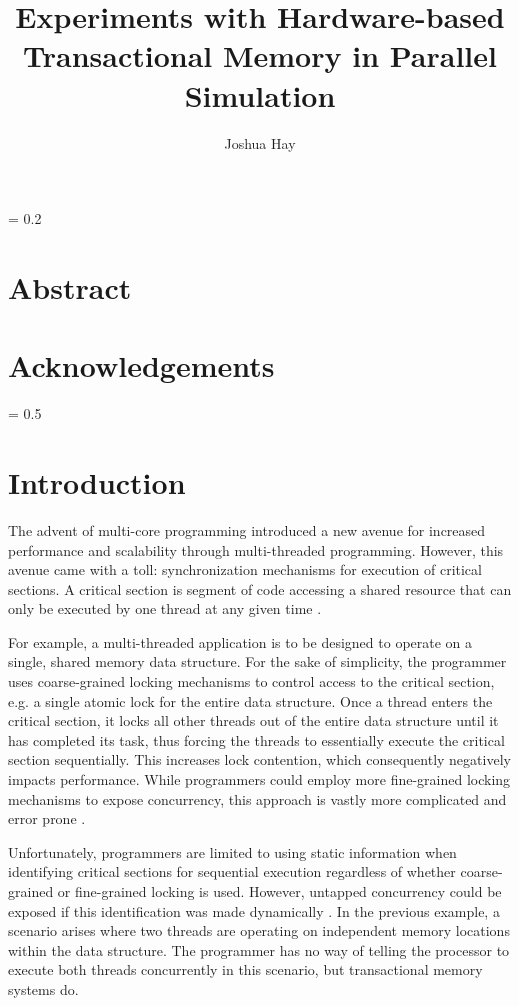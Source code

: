 \documentclass[a4paper]{article}
\title{
    \vspace{2in}
    \textbf{Experiments with Hardware-based Transactional Memory in Parallel
    Simulation \\}
    \vspace{2in}
}
\author{Joshua Hay}
\affil{hayja@mail.uc.edu}
\affil{(513) 607-4929}
\begin{document}
%
\maketitle
\thispagestyle{empty}
\newpage
\thispagestyle{empty}
\parskip = 0.2\baselineskip
\newpage
\thispagestyle{empty}
\section*{\textbf{Abstract}}
\newpage
\thispagestyle{empty}
\section*{\textbf{Acknowledgements}}
\newpage
\thispagestyle{empty}
\tableofcontents
\newpage
\thispagestyle{empty}
\listoffigures
\listoftables
\parskip = 0.5\baselineskip
\newpage

\section{\textbf{Introduction}}

\indent 
The advent of multi-core programming introduced a new avenue for increased
performance and scalability through multi-threaded programming.  However, this
avenue came with a toll: synchronization mechanisms for execution of critical
sections.  A critical section is segment of code accessing a shared resource
that can only be executed by one thread at any given time \cite{os_concepts}.
\par

\indent 
For example, a multi-threaded application is to be designed to operate on a
single, shared memory data structure.  For the sake of simplicity, the
programmer uses coarse-grained locking mechanisms to control access to the
critical section, e.g. a single atomic lock for the entire data structure.  Once
a thread enters the critical section, it locks all other threads out of the
entire data structure until it has completed its task, thus forcing the threads
to essentially execute the critical section sequentially. This increases lock
contention, which consequently negatively impacts performance.  While
programmers could employ more fine-grained locking mechanisms to expose
concurrency, this approach is vastly more complicated and error prone
\cite{sle_rajwar}.  
\par

\indent 
Unfortunately, programmers are limited to using static information when
identifying critical sections for sequential execution regardless of whether
coarse-grained or fine-grained locking is used.  However, untapped concurrency
could be exposed if this identification was made dynamically
\cite{intel_prog_ref}.  In the previous example, a scenario arises where two
threads are operating on independent memory locations within the data structure.
The programmer has no way of telling the processor to execute both threads
concurrently in this scenario, but transactional memory systems do. 
\par
\end{document}
